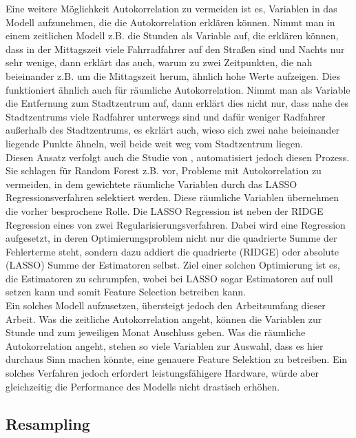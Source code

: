 \documentclass[a4paper,12pt]{thesis}
\begin{document}
Eine weitere Möglichkeit Autokorrelation zu vermeiden ist es, Variablen in das Modell aufzunehmen, die die Autokorrelation erklären können. Nimmt man in einem zeitlichen Modell z.B. die Stunden als Variable auf, die erklären können, dass in der Mittagszeit viele Fahrradfahrer auf den Straßen sind und Nachts nur sehr wenige, dann erklärt das auch, warum zu zwei Zeitpunkten, die nah beieinander z.B. um die Mittagszeit herum, ähnlich hohe Werte aufzeigen. Dies funktioniert ähnlich auch für räumliche Autokorrelation. Nimmt man als Variable die Entfernung zum Stadtzentrum auf, dann erklärt dies nicht nur, dass nahe des Stadtzentrums viele Radfahrer unterwegs sind und dafür weniger Radfahrer außerhalb des Stadtzentrums, es ekrlärt auch, wieso sich zwei nahe beieinander liegende Punkte ähneln, weil beide weit weg vom Stadtzentrum liegen.\\
Diesen Ansatz verfolgt auch die Studie von \cite{LiuAutocorrelation2022}, automatisiert jedoch diesen Prozess. Sie schlagen für Random Forest z.B. vor, Probleme mit Autokorrelation zu vermeiden, in dem gewichtete räumliche Variablen durch das LASSO Regressionsverfahren selektiert werden. Diese räumliche Variablen übernehmen die vorher besprochene Rolle. Die LASSO Regression ist neben der RIDGE Regression eines von zwei Regularisierungsverfahren. Dabei wird eine Regression aufgesetzt, in deren Optimierungsproblem nicht nur die quadrierte Summe der Fehlerterme steht, sondern dazu addiert die quadrierte (RIDGE) oder absolute (LASSO) Summe der Estimatoren selbst. Ziel einer solchen Optimierung ist es, die Estimatoren zu schrumpfen, wobei bei LASSO sogar Estimatoren auf null setzen kann und somit Feature Selection betreiben kann.\\
Ein solches Modell aufzusetzen, übersteigt jedoch den Arbeitsumfang dieser Arbeit. Was die zeitliche Autokorrelation angeht, können die Variablen zur Stunde und zum jeweiligen Monat Auschluss geben. Was die räumliche Autokorrelation angeht, stehen so viele Variablen zur Auswahl, dass es hier durchaus Sinn machen könnte, eine genauere Feature Selektion zu betreiben. Ein solches Verfahren jedoch erfordert leistungsfähigere Hardware, würde aber gleichzeitig die Performance des Modells nicht drastisch erhöhen.

\subsection{Resampling}
\end{document}
